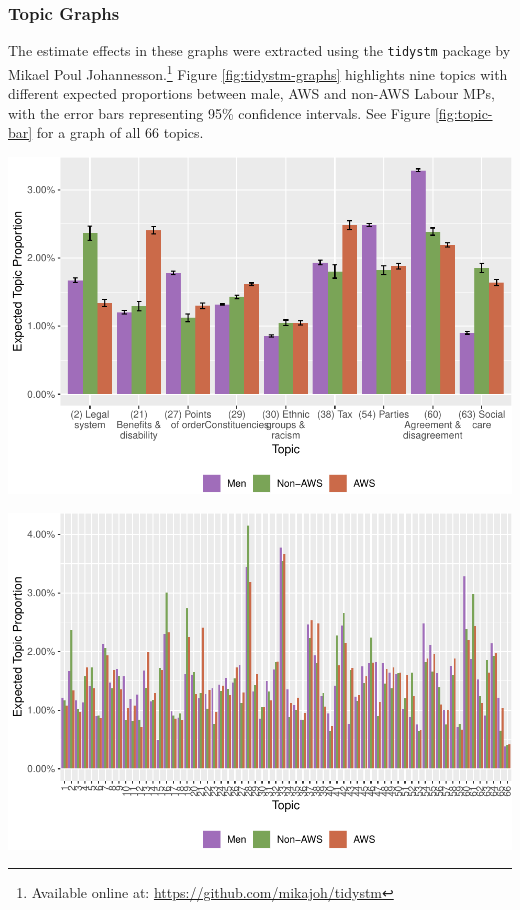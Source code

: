 \documentclass[]{article}
\let\rmarkdownfootnote\footnote%
\def\footnote{\protect\rmarkdownfootnote}
\let\origfigure\figure
\let\endorigfigure\endfigure
\renewenvironment{figure}[1][2] {
    \expandafter\origfigure\expandafter[H]
} {
    \endorigfigure
}
\theoremstyle{definition}
\theoremstyle{definition}
\theoremstyle{definition}
\theoremstyle{remark}
\begin{document}
\hypertarget{topic-graphs}{%
\subsubsection{Topic Graphs}\label{topic-graphs}}

The estimate effects in these graphs were extracted using the
\texttt{tidystm} package by Mikael Poul Johannesson.\footnote{Available
  online at: \url{https://github.com/mikajoh/tidystm}} Figure
\ref{fig:tidystm-graphs} highlights nine topics with different expected
proportions between male, AWS and non-AWS Labour MPs, with the error
bars representing 95\% confidence intervals. See Figure
\ref{fig:topic-bar} for a graph of all 66 topics.

\begin{figure}
\centering
\includegraphics{methodology_files/figure-latex/tidystm-graphs-1.pdf}
\caption{\label{fig:tidystm-graphs}Selected Topic Proportions}
\end{figure}

\begin{figure}
\centering
\includegraphics{methodology_files/figure-latex/topic-bar-1.pdf}
\caption{\label{fig:topic-bar}All Topic Proportions}
\end{figure}
\end{document}

